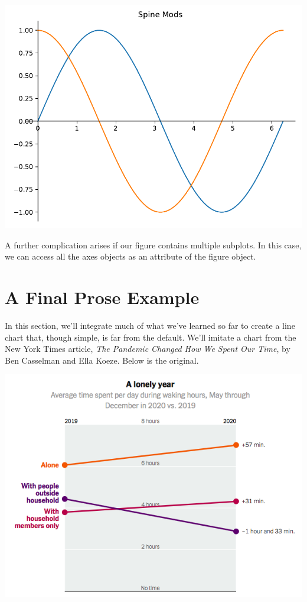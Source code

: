 

\begin{center}
    \includegraphics[width = .7\textwidth]{figures/proseplots/spine-mod2-ex.pdf}
\end{center}

A further complication arises if our figure contains multiple subplots. In this case, we can access all the axes objects as an attribute of the figure object. 






\section{A Final Prose Example}

In this section, we'll integrate much of what we've learned so far to create a line chart that, though simple, is far from the default. We'll imitate a chart from the New York Times article, \emph{The Pandemic Changed How We Spent Our Time}, by Ben Casselman and Ella Koeze. Below is the original. 

\begin{center}
    \includegraphics[width = .8\textwidth]{Images/nytATUS.png}
\end{center}

